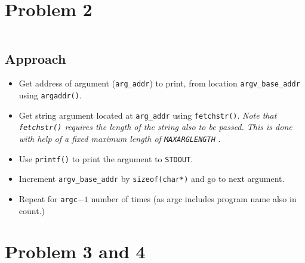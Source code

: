 \documentclass[11pt,a4paper,english]{paper}
\newenvironment{colorboxed}[4][gray]{
\begin{tcolorbox}[colback=#1!3!white,colframe=#1(ryb)!50!black,title=\textbf{#2: #3},#4]
}{
\end{tcolorbox}
}
\begin{document}
\section*{Problem 2}
\begin{colorboxed}{Code}{\texttt{kernel/sysproc.c::\textit{sys\_echo\_kernel()}}}{breakable}
    \inputminted[baselinestretch=0.85,firstline=119,lastline=143,breaklines]{c}{kernel/sysproc.c}
\end{colorboxed}
\subsection*{Approach}
\begin{itemize}[noitemsep, nolistsep]
    \item Get address of argument (\texttt{arg\_addr}) to print, from location \texttt{argv\_base\_addr} using \texttt{argaddr()}.
    \item Get string argument located at \texttt{arg\_addr} using \texttt{fetchstr()}. \textit{Note that \texttt{fetchstr()} requires the length of the string also to be passed. This is done with help of a fixed maximum length of \texttt{MAXARGLENGTH} }.
    \item Use \texttt{printf()} to print the argument to \texttt{STDOUT}.
    \item Increment \texttt{argv\_base\_addr} by \texttt{sizeof(char*)} and go to next argument.
    \item Repeat for \texttt{argc}$-1$ number of times (as argc includes program name also in count.)
\end{itemize}
\section*{Problem 3 and 4}
\begin{colorboxed}{Code}{\texttt{kernel/sysproc.c::\textit{sys\_trace()}}}{unbreakable}
    \inputminted[baselinestretch=0.85,firstline=145,lastline=155,breaklines]{c}{kernel/sysproc.c}
\end{colorboxed}
\begin{colorboxed}{Code}{\texttt{kernel/syscall.c::\textit{syscall()}}}{unbreakable}
    \inputminted[baselinestretch=0.85,firstline=156,lastline=175,breaklines]{c}{kernel/syscall.c}
\end{colorboxed}
\end{document}
